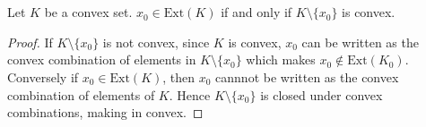 
\chapter{}

\begin{lemma}
   Let $K$ be a convex set. $x_0 \in \textrm{Ext}(K)$ if and only if $K \setminus \{ x_0 \}$ is convex.
   \label{lem:extreme_point_of_convex_set}
\end{lemma}
\begin{proof}
  If $K \setminus \{ x_0 \}$ is not convex, since $K$ is convex,
  $x_0$ can be written as the convex combination of elements in $K\setminus \{ x_0 \}$
  which makes $x_0 \notin \textrm{Ext}(K_0)$. Conversely if $x_0 \in \textrm{Ext}(K)$, then
  $x_0$ cannnot be written as the convex combination of elements of $K$. Hence $K \setminus \{ x_0 \}$
  is closed under convex combinations, making in convex.
\end{proof}

